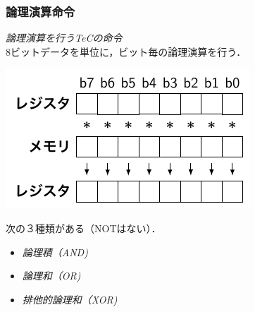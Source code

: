 \documentclass{beamer}                 %
\begin{document}
\begin{frame}
\begin{tabular}{l l}
  \end{tabular}
  \vfill
\end{frame}

\begin{frame}
  \frametitle{論理演算命令}
  \emph{論理演算を行うTeCの命令} \\
  8ビットデータを単位に，ビット毎の論理演算を行う． \\
  \centerline{\includegraphics[scale=0.8]{../Tikz/land.pdf}}
  \vfill
  次の３種類がある（NOTはない）．
  \begin{itemize}
  \item \emph{論理積（AND)}
  \item \emph{論理和（OR)}
  \item \emph{排他的論理和（XOR)}
  \end{itemize}
  \vfill
\end{frame}
\end{document}
